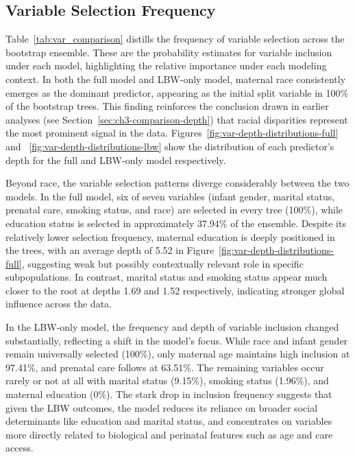 \subsection{Variable Selection Frequency}
\label{ch3:boot-var-selection}
Table~\ref{tab:var_comparison} distills the frequency of variable selection across the bootstrap ensemble. These are the probability estimates for variable inclusion under each model, highlighting the relative importance under each modeling context. In both the full model and LBW-only model, maternal race consistently emerges as the dominant predictor, appearing as the initial split variable in 100\% of the bootstrap trees. This finding reinforces the conclusion drawn in earlier analyses (see Section~\ref{sec:ch3-comparison-depth}) that racial disparities represent the most prominent signal in the data. Figures~\ref{fig:var-depth-distributions-full} and ~\ref{fig:var-depth-distributions-lbw} show the distribution of each predictor's depth for the full and LBW-only model respectively. 

Beyond race, the variable selection patterns diverge considerably between the two models. In the full model, six of seven variables (infant gender, marital status, prenatal care, smoking status, and race) are selected in every tree (100\%), while education status is selected in approximately 37.94\% of the ensemble. Despite its relatively lower selection frequency, maternal education is deeply positioned in the trees, with an average depth of 5.52 in Figure~\ref{fig:var-depth-distributions-full}, suggesting weak but possibly contextually relevant role in specific subpopulations. In contrast, marital status and smoking status appear much closer to the root at depths 1.69 and 1.52 respectively, indicating stronger global influence across the data. 

In the LBW-only model, the frequency and depth of variable inclusion changed substantially, reflecting a shift in the model's focus. While race and infant gender remain universally selected (100\%), only maternal age maintains high inclusion at 97.41\%, and prenatal care follows at 63.51\%. The remaining variables occur rarely or not at all with marital status (9.15\%), smoking status (1.96\%), and maternal education (0\%). The stark drop in inclusion frequency suggests that given the LBW outcomes, the model reduces its reliance on broader social determinants like education and marital status, and concentrates on variables more directly related to biological and perinatal features such as age and care access. 

